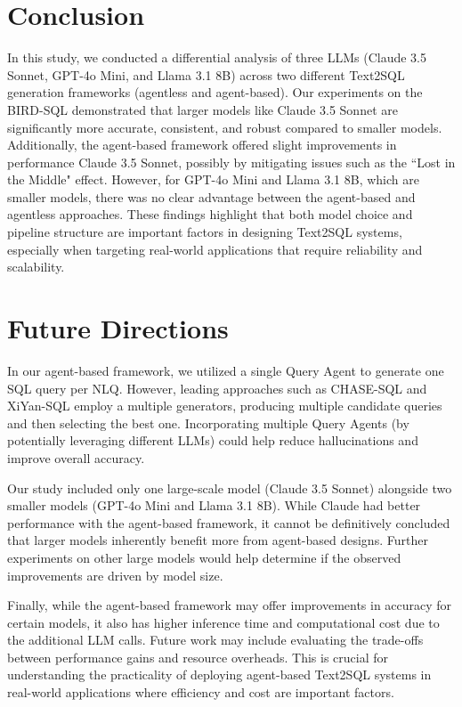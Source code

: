 \documentclass[10pt,twocolumn]{article}
\begin{document}
\section{Conclusion}

In this study, we conducted a differential analysis of three LLMs (Claude 3.5 Sonnet, GPT-4o Mini, and Llama 3.1 8B) across two different Text2SQL generation frameworks (agentless and agent-based). Our experiments on the BIRD-SQL demonstrated that larger models like Claude 3.5 Sonnet are significantly more accurate, consistent, and robust compared to smaller models. Additionally, the agent-based framework offered slight improvements in performance Claude 3.5 Sonnet, possibly by mitigating issues such as the ``Lost in the Middle" effect. However, for GPT-4o Mini and Llama 3.1 8B, which are smaller models, there was no clear advantage between the agent-based and agentless approaches. These findings highlight that both model choice and pipeline structure are important factors in designing Text2SQL systems, especially when targeting real-world applications that require reliability and scalability.

\section{Future Directions}

In our agent-based framework, we utilized a single Query Agent to generate one SQL query per NLQ. However, leading approaches such as CHASE-SQL and XiYan-SQL employ a multiple generators, producing multiple candidate queries and then selecting the best one. Incorporating multiple Query Agents (by potentially leveraging different LLMs) could help reduce hallucinations and improve overall accuracy.

Our study included only one large-scale model (Claude 3.5 Sonnet) alongside two smaller models (GPT-4o Mini and Llama 3.1 8B). While Claude had better performance with the agent-based framework, it cannot be definitively concluded that larger models inherently benefit more from agent-based designs. Further experiments on other large models would help determine if the observed improvements are driven by model size.

Finally, while the agent-based framework may offer improvements in accuracy for certain models, it also has higher inference time and computational cost due to the additional LLM calls. Future work may include evaluating the trade-offs between performance gains and resource overheads. This is crucial for understanding the practicality of deploying agent-based Text2SQL systems in real-world applications where efficiency and cost are important factors.




\pagebreak
\end{document}
